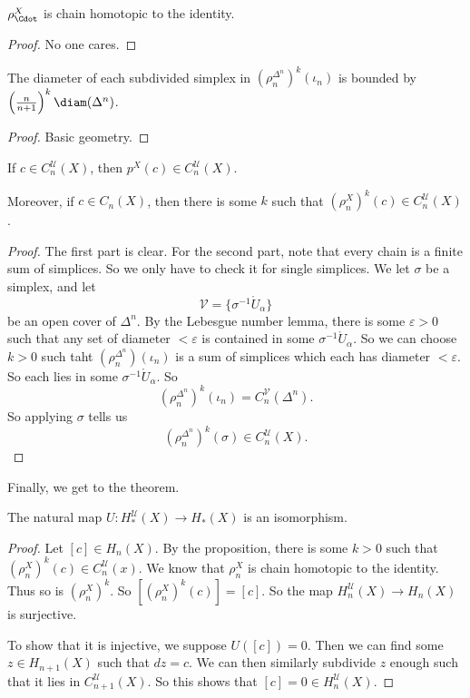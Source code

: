 \documentclass[a4paper]{article}
\begin{document}
\begin{lemma}
  $\rho_\Cdot^X$ is chain homotopic to the identity.
\end{lemma}

\begin{proof}
  No one cares.
\end{proof}

\begin{lemma}
  The diameter of each subdivided simplex in $(\rho_n^{\Delta^n})^k(\iota_n)$ is bounded by $\left(\frac{n}{n + 1}\right)^k \diam(\Delta^n)$.
\end{lemma}

\begin{proof}
  Basic geometry.
\end{proof}

\begin{prop}
  If $c \in C_n^\mathcal{U}(X)$, then $p^X(c) \in C_n^{\mathcal{U}}(X)$.

  Moreover, if $c \in C_n(X)$, then there is some $k$ such that $(\rho_n^{X})^k(c) \in C_n^{\mathcal{U}}(X)$.
\end{prop}

\begin{proof}
  The first part is clear. For the second part, note that every chain is a finite sum of simplices. So we only have to check it for single simplices. We let $\sigma$ be a simplex, and let
  \[
    \mathcal{V} = \{\sigma^{-1} \mathring{U}_\alpha\}
  \]
  be an open cover of $\Delta^n$. By the Lebesgue number lemma, there is some $\varepsilon > 0$ such that any set of diameter $< \varepsilon$ is contained in some $\sigma^{-1} \mathring{U}_\alpha$. So we can choose $k > 0$ such taht $(\rho_n^{\Delta^n}) (\iota_n)$ is a sum of simplices which each has diameter $< \varepsilon$. So each lies in some $\sigma^{-1}\mathring{U}_\alpha$. So
  \[
    (\rho_n^{\Delta^n})^k (\iota_n) = C_n^{\mathcal{V}} (\Delta^n).
  \]
  So applying $\sigma$ tells us
  \[
    (\rho_n^{\Delta^n})^k (\sigma) \in C_n^\mathcal{U}(X).
  \]
\end{proof}

Finally, we get to the theorem.
\begin{thm}
  The natural map $U: H_*^\mathcal{U}(X) \to H_*(X)$ is an isomorphism.
\end{thm}

\begin{proof}
  Let $[c] \in H_n(X)$. By the proposition, there is some $k > 0$ such that $(\rho_n^X)^k (c) \in C_n^{\mathcal{U}}(x)$. We know that $\rho_n^X$ is chain homotopic to the identity. Thus so is $(\rho_n^X)^k$. So $[(\rho_n^X)^k (c)] = [c]$. So the map $H_n^\mathcal{U}(X) \to H_n(X)$ is surjective.

  To show that it is injective, we suppose $U([c]) = 0$. Then we can find some $z \in H_{n + 1}(X)$ such that $dz = c$. We can then similarly subdivide $z$ enough such that it lies in $C^\mathcal{U}_{n + 1}(X)$. So this shows that $[c] = 0 \in H_n^{\mathcal{U}}(X)$.
\end{proof}
\end{document}
